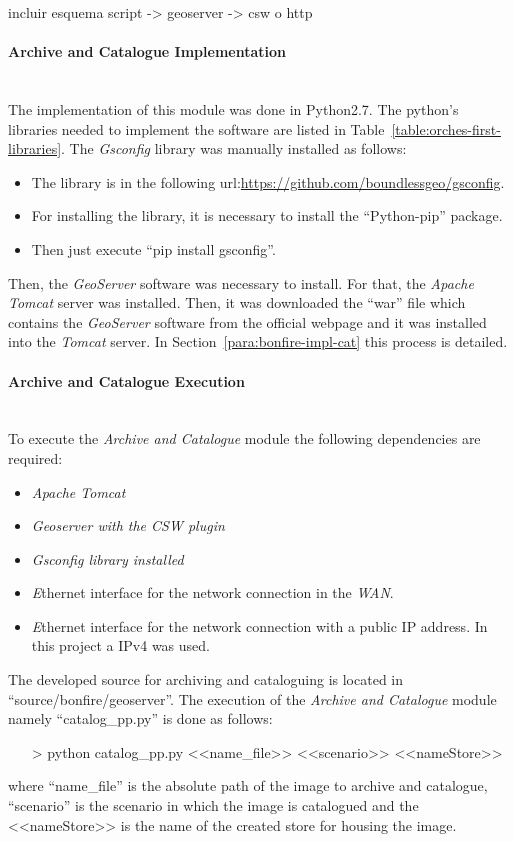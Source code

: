 incluir esquema script -> geoserver -> csw o http

\paragraph{Archive and Catalogue Implementation}~\\

The implementation of this module was done in Python2.7. The python's libraries
needed to implement the software are listed in Table~\ref{table:orches-first-libraries}.
The \emph{Gsconfig} library was manually installed as follows:
\begin{itemize}
\item The library is in the following
  url:\url{https://github.com/boundlessgeo/gsconfig}.
\item For installing the library, it is necessary to install the ``Python-pip''
  package.
\item Then just execute ``pip install gsconfig''.
\end{itemize}

Then, the \emph{GeoServer} software was necessary to install. For that, the
\emph{Apache Tomcat} server was installed. Then, it was downloaded the ``war''
file which contains the \emph{GeoServer} software from the official webpage and
it was installed into the \emph{Tomcat} server. In Section~\ref{para:bonfire-impl-cat} this process
is detailed. 

\paragraph{Archive and Catalogue Execution}~\\

To execute the \emph{Archive and Catalogue} module the following dependencies
are required:
\begin{itemize}
\item \emph{Apache Tomcat}
\item \emph{Geoserver with the \ac{CSW} plugin}
\item \emph{Gsconfig library installed}
\item \emph Ethernet interface for the network connection in the \bonfire
  \emph{WAN}.
\item \emph Ethernet interface for the network connection with a public \ac{IP}
  address. In this project a \ac{IP}v4 was used.
\end{itemize}

The developed source for archiving and cataloguing is located in
``source/bonfire/geoserver''. The execution of the \emph{Archive and Catalogue}
module namely ``catalog\_pp.py'' is done as follows:
\begin{itemize}
\item[>] python catalog\_pp.py <<name\_file>> <<scenario>> <<nameStore>>
\end{itemize}
where ``name\_file'' is the absolute path of the image to archive and catalogue,
``scenario'' is the scenario in which the image is catalogued and the
<<nameStore>> is the name of the created store for housing the image.


